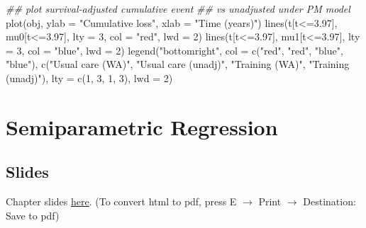 \documentclass[
  letterpaper,
  DIV=11,
  numbers=noendperiod]{scrreprt}
\newenvironment{Shaded}{\begin{snugshade}}{\end{snugshade}}
\newcommand{\AttributeTok}[1]{\textcolor[rgb]{0.40,0.45,0.13}{#1}}
\newcommand{\DecValTok}[1]{\textcolor[rgb]{0.68,0.00,0.00}{#1}}
\newcommand{\DocumentationTok}[1]{\textcolor[rgb]{0.37,0.37,0.37}{\textit{#1}}}
\newcommand{\FloatTok}[1]{\textcolor[rgb]{0.68,0.00,0.00}{#1}}
\newcommand{\FunctionTok}[1]{\textcolor[rgb]{0.28,0.35,0.67}{#1}}
\newcommand{\NormalTok}[1]{\textcolor[rgb]{0.00,0.23,0.31}{#1}}
\newcommand{\SpecialCharTok}[1]{\textcolor[rgb]{0.37,0.37,0.37}{#1}}
\newcommand{\StringTok}[1]{\textcolor[rgb]{0.13,0.47,0.30}{#1}}
\begin{document}
\begin{Shaded}
\begin{Highlighting}[]
\DocumentationTok{\#\# plot survival{-}adjusted cumulative event }
\DocumentationTok{\#\# vs unadjusted under PM model}
\FunctionTok{plot}\NormalTok{(obj, }\AttributeTok{ylab =} \StringTok{"Cumulative loss"}\NormalTok{, }\AttributeTok{xlab =} \StringTok{"Time (years)"}\NormalTok{)}
\FunctionTok{lines}\NormalTok{(t[t}\SpecialCharTok{\textless{}=}\FloatTok{3.97}\NormalTok{], mu0[t}\SpecialCharTok{\textless{}=}\FloatTok{3.97}\NormalTok{], }\AttributeTok{lty =} \DecValTok{3}\NormalTok{, }\AttributeTok{col =} \StringTok{"red"}\NormalTok{, }\AttributeTok{lwd =} \DecValTok{2}\NormalTok{)}
\FunctionTok{lines}\NormalTok{(t[t}\SpecialCharTok{\textless{}=}\FloatTok{3.97}\NormalTok{], mu1[t}\SpecialCharTok{\textless{}=}\FloatTok{3.97}\NormalTok{], }\AttributeTok{lty =} \DecValTok{3}\NormalTok{, }\AttributeTok{col =} \StringTok{"blue"}\NormalTok{, }\AttributeTok{lwd =} \DecValTok{2}\NormalTok{)}
\FunctionTok{legend}\NormalTok{(}\StringTok{"bottomright"}\NormalTok{, }\AttributeTok{col =} \FunctionTok{c}\NormalTok{(}\StringTok{"red"}\NormalTok{, }\StringTok{"red"}\NormalTok{, }\StringTok{"blue"}\NormalTok{, }\StringTok{"blue"}\NormalTok{), }
       \FunctionTok{c}\NormalTok{(}\StringTok{"Usual care (WA)"}\NormalTok{, }\StringTok{"Usual care (unadj)"}\NormalTok{, }
         \StringTok{"Training (WA)"}\NormalTok{, }\StringTok{"Training (unadj)"}\NormalTok{), }
       \AttributeTok{lty =} \FunctionTok{c}\NormalTok{(}\DecValTok{1}\NormalTok{, }\DecValTok{3}\NormalTok{, }\DecValTok{1}\NormalTok{, }\DecValTok{3}\NormalTok{), }\AttributeTok{lwd =} \DecValTok{2}\NormalTok{)}
\end{Highlighting}
\end{Shaded}


\hypertarget{semiparametric-regression}{%
\chapter{Semiparametric Regression}\label{semiparametric-regression}}

\hypertarget{slides-3}{%
\section*{Slides}\label{slides-3}}


Chapter slides \href{chap4.html}{here}. (To convert html to pdf, press E
\(\to\) Print \(\to\) Destination: Save to pdf)
\end{document}
